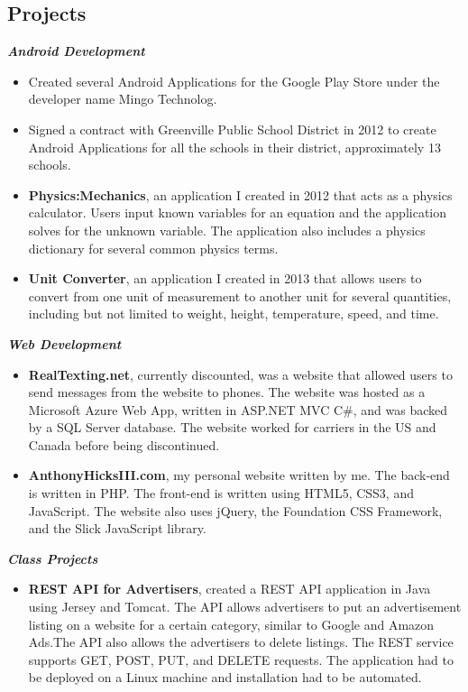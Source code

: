 \documentclass[10pt]{res}
\begin{document}
\begin{resume}
\section{Projects}
\textbf{\textit{Android Development}}
	\vspace*{.25em}
	\begin{itemize}
		\item Created several Android Applications for the Google Play Store under the developer name Mingo Technolog.
		\item Signed a contract with Greenville Public School District in 2012 to create Android Applications for all the schools in their district, approximately 13 schools. 
		\item \textbf{Physics:Mechanics}, an application I created in 2012 that acts as a physics calculator. Users input known variables for an equation and the application solves for the unknown variable. The application also includes a physics dictionary for several common physics terms. 
		\item \textbf{Unit Converter}, an application I created in 2013 that allows users to convert from one unit of measurement to another unit for several quantities, including but not limited to weight, height, temperature, speed, and time. 
	\end{itemize} 
\textbf{\textit{Web Development}}
	\vspace*{.25em}
	\begin{itemize}
		\item \textbf{RealTexting.net}, currently discounted, was a website that allowed users to send messages from the website to phones. The website was hosted as a Microsoft Azure Web App, written in ASP.NET MVC C\#, and was backed by a SQL Server database. The website worked for carriers in the US and Canada before being discontinued. 
		\item \textbf{AnthonyHicksIII.com}, my personal website written by me. The back-end is written in PHP. The front-end is written using HTML5, CSS3, and JavaScript. The website also uses jQuery, the Foundation CSS Framework, and the Slick JavaScript library.
	\end{itemize}
\textbf{\textit{Class Projects}}
	\vspace*{.25em}
	\begin{itemize}
		\item \textbf{REST API for Advertisers}, created a REST API application in Java using Jersey and Tomcat. The API allows advertisers to put an advertisement listing on a website for a certain category, similar to Google and Amazon Ads.The API also allows the advertisers to delete listings. The REST service supports GET, POST, PUT, and DELETE requests. The application had to be deployed on a Linux machine and installation had to be automated. 
	\end{itemize} 


\end{resume}
\end{document}
